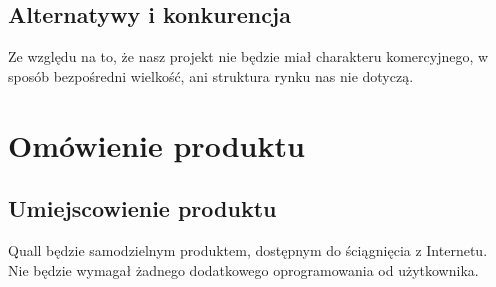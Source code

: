\documentclass[12pt,a4paper,twoside]{article}
\begin{document}





\subsection{Alternatywy i konkurencja}


Ze względu na to, że nasz projekt nie będzie miał charakteru komercyjnego, w sposób bezpośredni wielkość, ani struktura rynku nas nie dotyczą. 

\section{Omówienie produktu}





\subsection{Umiejscowienie produktu}
Quall będzie samodzielnym produktem, dostępnym do ściągnięcia z Internetu. 
Nie będzie wymagał żadnego dodatkowego oprogramowania od użytkownika.
\end{document}
